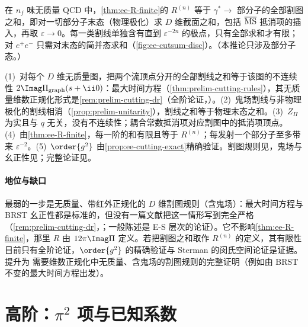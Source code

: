 \begin{corollary}\label{cor:ee-cuts}
在 $n_f$ 味无质量 QCD 中，\cref{thm:ee-R-finite}的 $R^{(n)}$ 等于 $\gamma^*\to$ 部分子的全部割图之和，即对一切部分子末态（物理极化）求 $D$ 维截面之和，包括 $\overline{\rm MS}$ 抵消项的插入，再取 $\varepsilon\to0$。每一类割线单独含有直到 $\varepsilon^{-2n}$ 的极点，只有全部求和才有限；对 $e^+e^-$ 只需对末态的简并态求和（\cref{fig:ee-cutsum-disc}）。（本推论只涉及部分子态。）
\end{corollary}
\begin{proofsketch}
(1)~对每个 $D$ 维无质量图，把两个流顶点分开的全部割线之和等于该图的不连续性 $2\Imag\Pi_{\rm graph}(s+\ii0)$：最大时间方程（\cref{thm:prelim-cutting-rules}），其无质量维数正规化形式是\cref{rem:prelim-cutting-dr}（全阶论证，\tagA）。(2)~鬼场割线与非物理极化的割线相消（\cref{prop:prelim-unitarity}），割线之和等于物理末态之和。(3)~$Z_\Pi$ 为实且与 $q$ 无关，没有不连续性；耦合常数抵消项对应割图中的抵消项顶点。(4)~由\cref{thm:ee-R-finite}，每一阶的和有限且等于 $R^{(n)}$；每发射一个部分子至多带来 $\varepsilon^{-2}$。(5)~$\order{g^2}$ 由\cref{prop:ee-cutting-exact}精确验证。割图规则见\cite{Cutkosky1960,Veltman1963,tHooftVeltman1974}，鬼场与幺正性见\cite{tHooftVeltman1972b,KugoOjima1979}；完整论证见\cite{Sterman1978a,Sterman1978b}。
\end{proofsketch}

\paragraph{地位与缺口}最弱的一步是无质量、带红外正规化的 $D$ 维割图规则（含鬼场）：最大时间方程与 BRST 幺正性都是标准的，但没有一篇文献把这一情形写到完全严格（\cref{rem:prelim-cutting-dr}，\tagA；一般陈述是 E-S 层次的论证）。它不影响\cref{thm:ee-R-finite}，那里 $R$ 由 $12\pi\Imag\Pi$ 定义。若把割图之和取作 $R^{(n)}$ 的定义，其有限性目前只有全阶论证，$\order{g^2}$ 的精确验证与 Sterman 的闵氏空间论证\cite{Sterman1978a,Sterman1978b}是证据。提升为 \tagR 需要维数正规化中无质量、含鬼场的割图规则的完整证明（例如由 BRST 不变的最大时间方程出发）。

\section{高阶：$\pi^2$ 项与已知系数}\label{sec:ee-higher}

